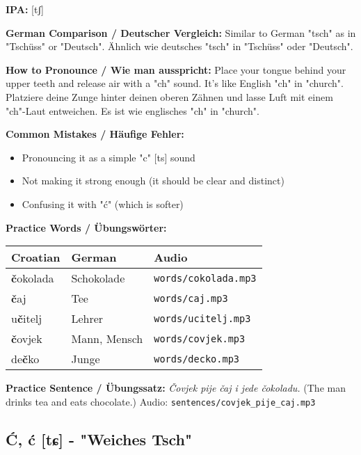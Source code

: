 \begin{tcolorbox}[colback=lightblue!30, colframe=croatianblue, title=\textbf{Č, č}]

\textbf{IPA:} [tʃ]

\textbf{German Comparison / Deutscher Vergleich:}
Similar to German "tsch" as in "Tschüss" or "Deutsch".
Ähnlich wie deutsches "tsch" in "Tschüss" oder "Deutsch".

\textbf{How to Pronounce / Wie man ausspricht:}
Place your tongue behind your upper teeth and release air with a "ch" sound. It's like English "ch" in "church".
Platziere deine Zunge hinter deinen oberen Zähnen und lasse Luft mit einem "ch"-Laut entweichen. Es ist wie englisches "ch" in "church".

\textbf{Common Mistakes / Häufige Fehler:}
\begin{itemize}
    \item Pronouncing it as a simple "c" [ts] sound
    \item Not making it strong enough (it should be clear and distinct)
    \item Confusing it with "ć" (which is softer)
\end{itemize}

\textbf{Practice Words / Übungswörter:}
\begin{tabular}{lll}
\textbf{Croatian} & \textbf{German} & \textbf{Audio} \\
\midrule
\textbf{č}okolada & Schokolade & \texttt{words/cokolada.mp3} \\
\textbf{č}aj & Tee & \texttt{words/caj.mp3} \\
u\textbf{č}itelj & Lehrer & \texttt{words/ucitelj.mp3} \\
\textbf{č}ovjek & Mann, Mensch & \texttt{words/covjek.mp3} \\
de\textbf{č}ko & Junge & \texttt{words/decko.mp3} \\
\end{tabular}

\textbf{Practice Sentence / Übungssatz:}
\textit{Čovjek pije čaj i jede čokoladu.}
(The man drinks tea and eats chocolate.)
Audio: \texttt{sentences/covjek\_pije\_caj.mp3}

\end{tcolorbox}

\subsection{Ć, ć [tɕ] - "Weiches Tsch"}

